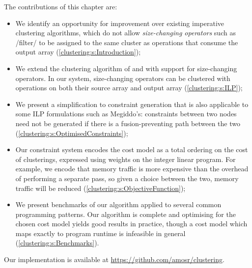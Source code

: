 The contributions of this chapter are:
\begin{itemize}
\item
We identify an opportunity for improvement over existing imperative clustering algorithms, which do not allow \emph{size-changing operators} such as \Hs/filter/ to be assigned to the same cluster as operations that consume the output array (\cref{clustering:s:Introduction});

\item   
We extend the clustering algorithm of \citet{megiddo1998optimal} and \citet{darte2002contraction} with support for size-changing operators.
In our system, size-changing operators can be clustered with operations on both their source array and output array (\cref{clustering:s:ILP});

\item
We present a simplification to constraint generation that is also applicable to some ILP formulations such as Megiddo's:
constraints between two nodes need not be generated if there is a fusion-preventing path between the two (\cref{clustering:s:OptimisedConstraints});

\item
Our constraint system encodes the cost model as a total ordering on the cost of clusterings, expressed using weights on the integer linear program.
For example, we encode that memory traffic is more expensive than the overhead of performing a separate pass, so given a choice between the two, memory traffic will be reduced (\cref{clustering:s:ObjectiveFunction});

\item
We present benchmarks of our algorithm applied to several common programming patterns.
Our algorithm is complete and optimising for the chosen cost model yields good results in practice, though a cost model which maps exactly to program runtime is infeasible in general (\cref{clustering:s:Benchmarks}).
\end{itemize}

Our implementation is available at \url{https://github.com/amosr/clustering}.



